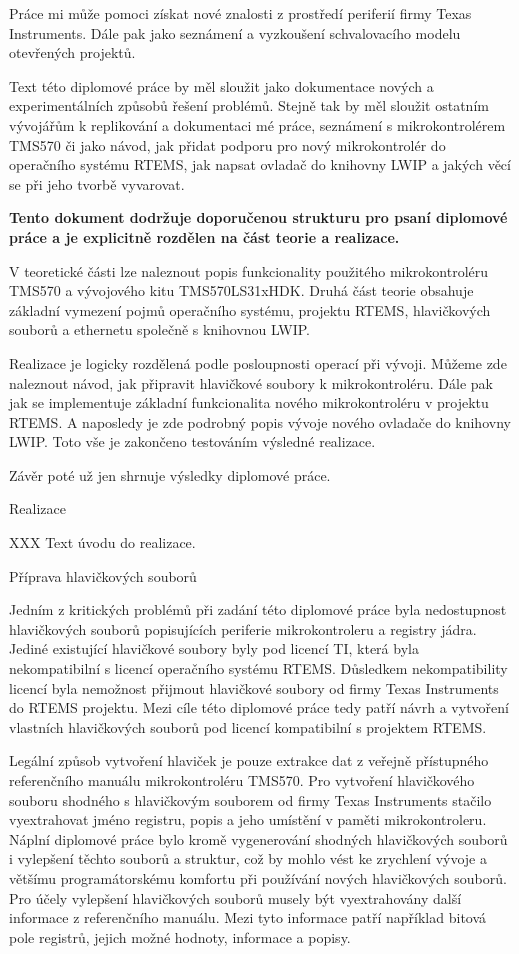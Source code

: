 Práce mi může pomoci získat nové znalosti z prostředí periferií firmy Texas Instruments. Dále pak jako seznámení a vyzkoušení schvalovacího modelu otevřených projektů.

Text této diplomové práce by měl sloužit jako dokumentace nových a experimentálních způsobů řešení problémů. Stejně tak by měl sloužit ostatním vývojářům k replikování a dokumentaci mé práce, seznámení s mikrokontrolérem TMS570 či jako návod, jak přidat podporu pro nový mikrokontrolér do operačního systému RTEMS, jak napsat ovladač do knihovny LWIP a jakých věcí se při jeho tvorbě vyvarovat.   

\medskip

{\bf
Tento dokument dodržuje doporučenou strukturu pro psaní diplomové práce a je explicitně rozdělen na část teorie a realizace.

V teoretické části lze naleznout popis funkcionality použitého mikrokontroléru TMS570 a vývojového kitu TMS570LS31xHDK.
Druhá část teorie obsahuje základní vymezení pojmů operačního systému, projektu RTEMS, hlavičkových souborů a ethernetu společně s knihovnou LWIP.

Realizace je logicky rozdělená podle posloupnosti operací při vývoji. Můžeme zde naleznout návod, jak připravit hlavičkové soubory k mikrokontroléru. Dále pak jak se implementuje základní funkcionalita nového mikrokontroléru v projektu RTEMS. A naposledy je zde podrobný popis vývoje nového ovladače do knihovny LWIP. Toto vše je zakončeno testováním výsledné realizace.

Závěr poté už jen shrnuje výsledky diplomové práce.}


\chap Realizace

XXX Text úvodu do realizace.

\sec Příprava hlavičkových souborů

	Jedním z kritických problémů při zadání této diplomové práce byla nedostupnost hlavičkových souborů popisujících periferie mikrokontroleru a registry jádra. Jediné existující hlavičkové soubory byly pod licencí TI, která byla nekompatibilní s licencí operačního systému RTEMS. Důsledkem nekompatibility licencí byla nemožnost přijmout hlavičkové soubory od firmy Texas Instruments do RTEMS projektu. Mezi cíle této diplomové práce tedy patří návrh a vytvoření vlastních hlavičkových souborů pod licencí kompatibilní s projektem RTEMS.

Legální způsob vytvoření hlaviček je pouze extrakce dat z veřejně přístupného referenčního manuálu mikrokontroléru TMS570. Pro vytvoření hlavičkového souboru shodného s hlavičkovým souborem od firmy Texas Instruments stačilo vyextrahovat jméno registru, popis a jeho umístění v paměti mikrokontroleru. Náplní diplomové práce bylo kromě vygenerování shodných hlavičkových souborů i vylepšení těchto souborů a struktur, což by mohlo vést ke zrychlení vývoje a většímu programátorskému komfortu při používání nových hlavičkových souborů. Pro účely vylepšení hlavičkových souborů musely být vyextrahovány další informace z referenčního manuálu. Mezi tyto informace patří například bitová pole registrů, jejich možné hodnoty, informace a popisy.

